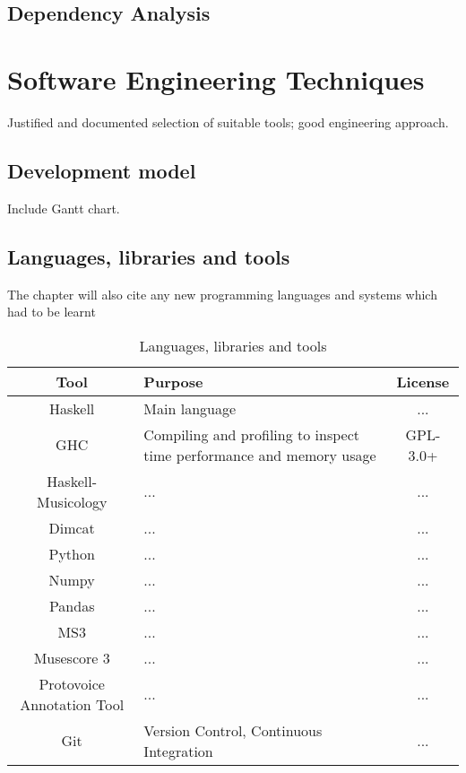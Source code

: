 \documentclass[12pt,a4paper,twoside,openright]{report}
\begin{document}
\subsection{Dependency Analysis}

\section{Software Engineering Techniques}
Justified and documented selection of suitable tools; good engineering approach.

\subsection{Development model}
Include Gantt chart.

\subsection{Languages, libraries and tools}
The chapter will also cite any new programming languages and systems which had to be learnt 

\begin{table}
  {
  \small
  \caption{Languages, libraries and tools}
  \label{Languages}
  \begin{center}
    \begin{tabularx}{.9\textwidth}{cXc}
      Tool & Purpose & License \\
      \toprule
      Haskell & Main language & ... \\
      \midrule
      GHC & Compiling and profiling to inspect time performance and memory usage  & GPL-3.0+ \\
      \midrule
      Haskell-Musicology & ... & ... \\
      \midrule
      Dimcat & ... & ... \\
      \midrule
      Python & ... & ... \\
      \midrule
      Numpy & ... & ... \\
      \midrule
      Pandas & ... & ... \\
      \midrule
      MS3 & ... & ... \\
      \midrule
      Musescore 3 & ... & ... \\
      \midrule
      Protovoice Annotation Tool & ... & ... \\
      \midrule
      Git & Version Control, Continuous Integration & ... \\
      \bottomrule
    \end{tabularx}
  \end{center}
  }
\end{table}
\end{document}
